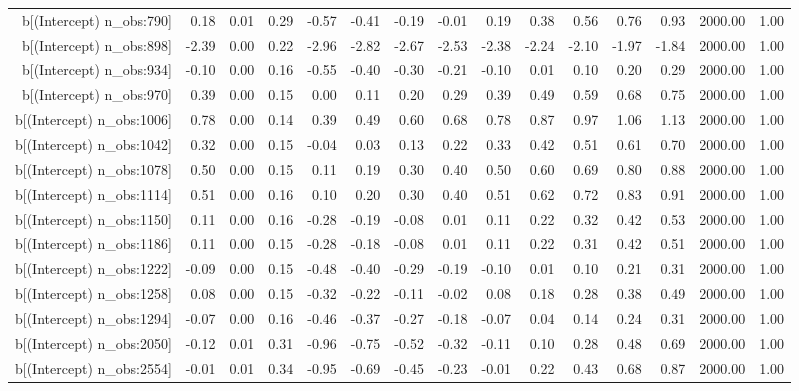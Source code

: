 \begin{table}[ht]
\begin{tabular}{rrrrrrrrrrrrrrr}
  b[(Intercept) n\_obs:790] & 0.18 & 0.01 & 0.29 & -0.57 & -0.41 & -0.19 & -0.01 & 0.19 & 0.38 & 0.56 & 0.76 & 0.93 & 2000.00 & 1.00 \\ 
  b[(Intercept) n\_obs:898] & -2.39 & 0.00 & 0.22 & -2.96 & -2.82 & -2.67 & -2.53 & -2.38 & -2.24 & -2.10 & -1.97 & -1.84 & 2000.00 & 1.00 \\ 
  b[(Intercept) n\_obs:934] & -0.10 & 0.00 & 0.16 & -0.55 & -0.40 & -0.30 & -0.21 & -0.10 & 0.01 & 0.10 & 0.20 & 0.29 & 2000.00 & 1.00 \\ 
  b[(Intercept) n\_obs:970] & 0.39 & 0.00 & 0.15 & 0.00 & 0.11 & 0.20 & 0.29 & 0.39 & 0.49 & 0.59 & 0.68 & 0.75 & 2000.00 & 1.00 \\ 
  b[(Intercept) n\_obs:1006] & 0.78 & 0.00 & 0.14 & 0.39 & 0.49 & 0.60 & 0.68 & 0.78 & 0.87 & 0.97 & 1.06 & 1.13 & 2000.00 & 1.00 \\ 
  b[(Intercept) n\_obs:1042] & 0.32 & 0.00 & 0.15 & -0.04 & 0.03 & 0.13 & 0.22 & 0.33 & 0.42 & 0.51 & 0.61 & 0.70 & 2000.00 & 1.00 \\ 
  b[(Intercept) n\_obs:1078] & 0.50 & 0.00 & 0.15 & 0.11 & 0.19 & 0.30 & 0.40 & 0.50 & 0.60 & 0.69 & 0.80 & 0.88 & 2000.00 & 1.00 \\ 
  b[(Intercept) n\_obs:1114] & 0.51 & 0.00 & 0.16 & 0.10 & 0.20 & 0.30 & 0.40 & 0.51 & 0.62 & 0.72 & 0.83 & 0.91 & 2000.00 & 1.00 \\ 
  b[(Intercept) n\_obs:1150] & 0.11 & 0.00 & 0.16 & -0.28 & -0.19 & -0.08 & 0.01 & 0.11 & 0.22 & 0.32 & 0.42 & 0.53 & 2000.00 & 1.00 \\ 
  b[(Intercept) n\_obs:1186] & 0.11 & 0.00 & 0.15 & -0.28 & -0.18 & -0.08 & 0.01 & 0.11 & 0.22 & 0.31 & 0.42 & 0.51 & 2000.00 & 1.00 \\ 
  b[(Intercept) n\_obs:1222] & -0.09 & 0.00 & 0.15 & -0.48 & -0.40 & -0.29 & -0.19 & -0.10 & 0.01 & 0.10 & 0.21 & 0.31 & 2000.00 & 1.00 \\ 
  b[(Intercept) n\_obs:1258] & 0.08 & 0.00 & 0.15 & -0.32 & -0.22 & -0.11 & -0.02 & 0.08 & 0.18 & 0.28 & 0.38 & 0.49 & 2000.00 & 1.00 \\ 
  b[(Intercept) n\_obs:1294] & -0.07 & 0.00 & 0.16 & -0.46 & -0.37 & -0.27 & -0.18 & -0.07 & 0.04 & 0.14 & 0.24 & 0.31 & 2000.00 & 1.00 \\ 
  b[(Intercept) n\_obs:2050] & -0.12 & 0.01 & 0.31 & -0.96 & -0.75 & -0.52 & -0.32 & -0.11 & 0.10 & 0.28 & 0.48 & 0.69 & 2000.00 & 1.00 \\ 
  b[(Intercept) n\_obs:2554] & -0.01 & 0.01 & 0.34 & -0.95 & -0.69 & -0.45 & -0.23 & -0.01 & 0.22 & 0.43 & 0.68 & 0.87 & 2000.00 & 1.00 \\ 

\end{tabular}
\end{table}
